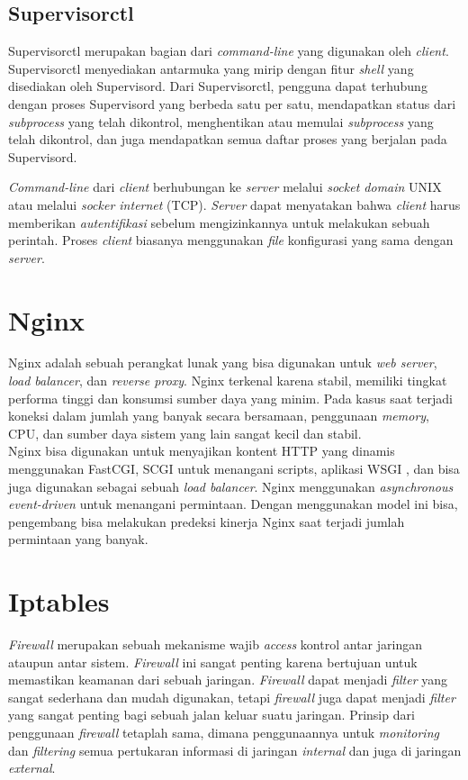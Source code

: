 \subsection{Supervisorctl}
Supervisorctl merupakan bagian dari \textit{command-line} yang digunakan oleh \textit{client}. Supervisorctl menyediakan antarmuka yang mirip dengan fitur \textit{shell} yang disediakan oleh Supervisord. Dari Supervisorctl, pengguna dapat terhubung dengan proses Supervisord yang berbeda satu per satu, mendapatkan status dari \textit{subprocess} yang telah dikontrol, menghentikan atau memulai \textit{subprocess} yang telah dikontrol, dan juga mendapatkan semua daftar proses yang berjalan pada Supervisord.

\textit{Command-line} dari \textit{client} berhubungan ke \textit{server} melalui \textit{socket domain} UNIX atau melalui \textit{socker internet} (TCP). \textit{Server} dapat menyatakan bahwa \textit{client} harus memberikan \textit{autentifikasi} sebelum mengizinkannya untuk melakukan sebuah perintah. Proses \textit{client} biasanya menggunakan \textit{file} konfigurasi yang sama dengan \textit{server}. 

\section{Nginx}
Nginx adalah sebuah perangkat lunak yang bisa digunakan untuk \textit{web server}, \textit{load balancer}, dan \textit{reverse proxy}. Nginx terkenal karena stabil, memiliki tingkat performa tinggi dan konsumsi sumber daya yang minim. Pada kasus saat terjadi koneksi dalam jumlah yang banyak secara bersamaan, penggunaan \textit{memory}, CPU, dan sumber daya sistem yang lain sangat kecil dan stabil. \cite{bab2-nginx}\\
\indent Nginx bisa digunakan untuk menyajikan kontent HTTP yang dinamis menggunakan FastCGI, SCGI untuk menangani scripts, aplikasi WSGI , dan bisa juga digunakan sebagai sebuah \textit{load balancer}. Nginx menggunakan \textit{asynchronous event-driven} untuk menangani permintaan. Dengan menggunakan model ini bisa, pengembang bisa melakukan predeksi kinerja Nginx saat terjadi jumlah permintaan yang banyak.

\section{Iptables} 
\textit{Firewall} merupakan sebuah mekanisme wajib \textit{access} kontrol antar jaringan ataupun antar sistem. \textit{Firewall} ini sangat penting karena bertujuan untuk memastikan keamanan dari sebuah jaringan. \textit{Firewall} dapat menjadi \textit{filter} yang sangat sederhana dan mudah digunakan, tetapi \textit{firewall} juga dapat menjadi \textit{filter} yang sangat penting bagi sebuah jalan keluar suatu jaringan. Prinsip dari penggunaan \textit{firewall} tetaplah sama, dimana penggunaannya untuk \textit{monitoring} dan \textit{filtering} semua pertukaran informasi di jaringan \textit{internal} dan juga di jaringan \textit{external}.

